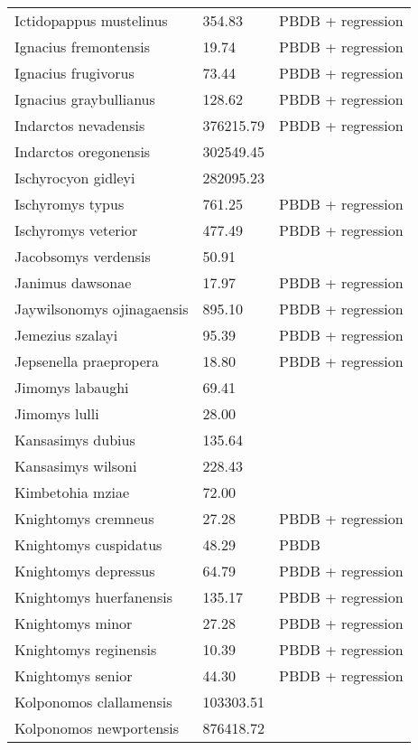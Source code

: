 \documentclass{article}
\begin{document}
\begin{center}
\begin{longtable}{p{} p{} p{} }
  Ictidopappus mustelinus & 354.83 & PBDB + regression \\ 
  Ignacius fremontensis & 19.74 & PBDB + regression \\ 
  Ignacius frugivorus & 73.44 & PBDB + regression \\ 
  Ignacius graybullianus & 128.62 & PBDB + regression \\ 
  Indarctos nevadensis & 376215.79 & PBDB + regression \\ 
  Indarctos oregonensis & 302549.45 & \cite{Tomiya2013} \\ 
  Ischyrocyon gidleyi & 282095.23 & \cite{Tomiya2013} \\ 
  Ischyromys typus & 761.25 & PBDB + regression \\ 
  Ischyromys veterior & 477.49 & PBDB + regression \\ 
  Jacobsomys verdensis & 50.91 & \cite{Tomiya2013} \\ 
  Janimus dawsonae & 17.97 & PBDB + regression \\ 
  Jaywilsonomys ojinagaensis & 895.10 & PBDB + regression \\ 
  Jemezius szalayi & 95.39 & PBDB + regression \\ 
  Jepsenella praepropera & 18.80 & PBDB + regression \\ 
  Jimomys labaughi & 69.41 & \cite{Tomiya2013} \\ 
  Jimomys lulli & 28.00 & \cite{McKenna2011} \\ 
  Kansasimys dubius & 135.64 & \cite{Tomiya2013} \\ 
  Kansasimys wilsoni & 228.43 & \cite{Matthew1901} \\ 
  Kimbetohia mziae & 72.00 & \cite{Wilson2012} \\ 
  Knightomys cremneus & 27.28 & PBDB + regression \\ 
  Knightomys cuspidatus & 48.29 & PBDB \\ 
  Knightomys depressus & 64.79 & PBDB + regression \\ 
  Knightomys huerfanensis & 135.17 & PBDB + regression \\ 
  Knightomys minor & 27.28 & PBDB + regression \\ 
  Knightomys reginensis & 10.39 & PBDB + regression \\ 
  Knightomys senior & 44.30 & PBDB + regression \\ 
  Kolponomos clallamensis & 103303.51 & \cite{Tseng2009} \\ 
  Kolponomos newportensis & 876418.72 & \cite{Scott2013} \\ 

\end{longtable}
\end{center}
\end{document}
